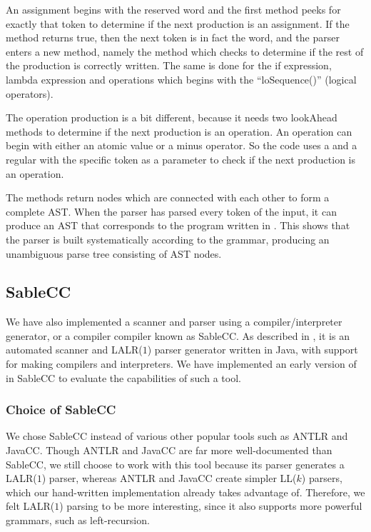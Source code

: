An assignment begins with the reserved word  and the first
 method peeks for exactly that token to determine
if the next production is an assignment. If the method returns true, then
the next token is in fact the  word, and the parser enters a
new method, namely the  method which checks to
determine if the rest of the production is correctly written. The same
is done for the if expression, lambda expression and operations which
begins with the ``loSequence()'' (logical operators).

The operation production is a bit different, because it needs two lookAhead
methods to determine if the next production is an operation. An operation can
begin with either an atomic value or a minus operator. So the code uses a
 and a regular  with the
specific token as a parameter to check if the next production is an operation.

The methods return nodes which are connected with each other to form
a complete AST. When the parser has parsed every token of the input,
it can produce an AST that corresponds to the program written in
\productname{}. This shows that the parser is built systematically
according to the grammar, producing an unambiguous parse tree consisting of AST
nodes.

\subsection{SableCC}
We have also implemented a scanner and parser using a
compiler/interpreter generator, or a compiler compiler
known as SableCC\cite{sableccdoc}. As described in
, it is an automated scanner and
LALR($1$) parser generator written in Java, with support for making
compilers and interpreters. We have implemented an early version of
\productname{} in SableCC to evaluate the capabilities of such a tool.

\subsubsection{Choice of SableCC}
We chose SableCC instead of various other popular tools such as
ANTLR\cite{antlr} and JavaCC\cite{javacc}. Though ANTLR and JavaCC are
far more well-documented than SableCC, we still choose to work with
this tool because its parser generates a LALR($1$) parser, whereas
ANTLR and JavaCC create simpler LL($k$) parsers, which our hand-written
implementation already takes advantage of. Therefore, we felt LALR($1$)
parsing to be more interesting, since it also supports more powerful
grammars, such as left-recursion.

